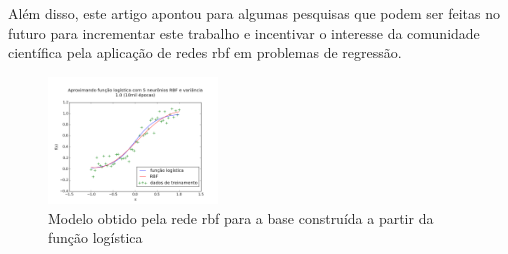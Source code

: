 \documentclass[conference]{IEEEtran}
\begin{document}
Além disso, este artigo apontou para algumas pesquisas que podem ser feitas no 
futuro para incrementar este trabalho e incentivar o interesse da comunidade 
científica pela aplicação de redes \ac*{rbf} em problemas de regressão.

\begin{figure}[t]
	\caption{Modelo obtido pela rede \ac*{rbf} para a base construída a partir 
		da função logística}
	\label{fig:rsl_logistic}
	\centering
	\includegraphics[width=0.40\textwidth]{f_5v1_all_paper}
\end{figure}



\end{document}
